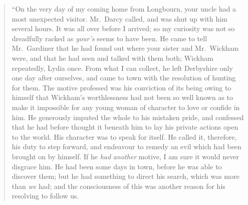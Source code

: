\documentclass[12pt,english,oneside]{book}
\begin{document}
\begin{quotation}
{}``On the very day of my coming home from Longbourn, your uncle
had a most unexpected visitor. Mr.\ Darcy called, and was shut up
with him several hours. It was all over before I arrived; so my curiosity
was not so dreadfully racked as \textit{your's} seems to have been.
He came to tell Mr.\ Gardiner that he had found out where your sister
and Mr.\ Wickham were, and that he had seen and talked with them
both; Wickham repeatedly, Lydia once. From what I can collect, he
left Derbyshire only one day after ourselves, and came to town with
the resolution of hunting for them. The motive professed was his conviction
of its being owing to himself that Wickham's worthlessness had not
been so well known as to make it impossible for any young woman of
character to love or confide in him. He generously imputed the whole
to his mistaken pride, and confessed that he had before thought it
beneath him to lay his private actions open to the world. His character
was to speak for itself. He called it, therefore, his duty to step
forward, and endeavour to remedy an evil which had been brought on
by himself. If he \textit{had} \textit{another} motive, I am sure
it would never disgrace him. He had been some days in town, before
he was able to discover them; but he had something to direct his search,
which was more than \textit{we} had; and the consciousness of this
was another reason for his resolving to follow us.


\end{quotation}
\end{document}
